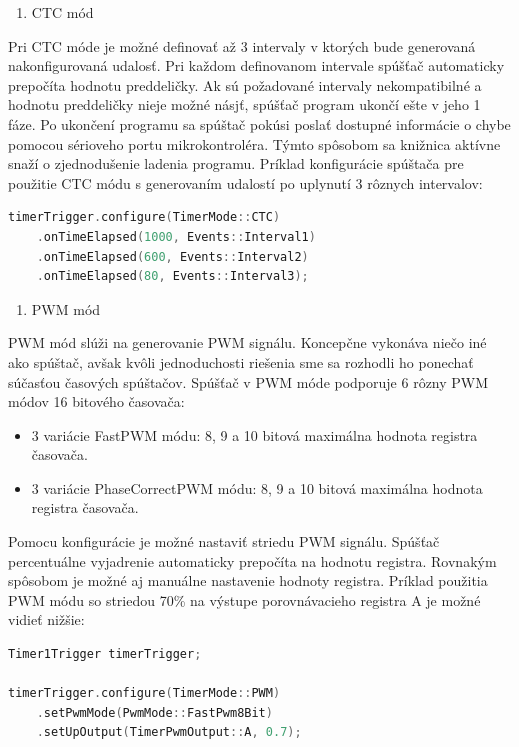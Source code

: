 \begin{enumerate}[resume]
    \item CTC mód
\end{enumerate}

Pri CTC móde je možné definovať až 3 intervaly v ktorých bude generovaná nakonfigurovaná udalosť. Pri každom definovanom intervale spúšťač automaticky prepočíta
hodnotu preddeličky. Ak sú požadované intervaly nekompatibilné a hodnotu preddeličky nieje možné násjť, spúšťač program ukončí ešte v jeho 1 fáze. Po ukončení programu
sa spúštač pokúsi poslať dostupné informácie o chybe pomocou sérioveho portu mikrokontroléra. Týmto spôsobom sa knižnica aktívne snaží o zjednodušenie ladenia programu.
Príklad konfigurácie spúštača pre použitie CTC módu s generovaním udalostí po uplynutí 3 rôznych intervalov:
\begin{lstlisting}[language=c++]      
timerTrigger.configure(TimerMode::CTC)
    .onTimeElapsed(1000, Events::Interval1)
    .onTimeElapsed(600, Events::Interval2)
    .onTimeElapsed(80, Events::Interval3);
\end{lstlisting}

\begin{enumerate}[resume]
    \item PWM mód
\end{enumerate}

PWM mód slúži na generovanie PWM signálu. Koncepčne vykonáva niečo iné ako spúštač, avšak kvôli jednoduchosti riešenia sme sa rozhodli ho ponechať súčasťou časových
spúštačov. Spúšťač v PWM móde podporuje 6 rôzny PWM módov 16 bitového časovača:
\begin{itemize}
    \item 3 variácie FastPWM módu: 8, 9 a 10 bitová maximálna hodnota registra časovača.
    \item 3 variácie PhaseCorrectPWM módu: 8, 9 a 10 bitová maximálna hodnota registra časovača.
\end{itemize}

Pomocu konfigurácie je možné nastaviť striedu PWM signálu. Spúšťač percentuálne vyjadrenie automaticky prepočíta na hodnotu registra. Rovnakým spôsobom je možné
aj manuálne nastavenie hodnoty registra. Príklad použitia PWM módu so striedou 70\% na  výstupe porovnávacieho registra A je možné vidieť nižšie:

\begin{lstlisting}[language=c++]      
Timer1Trigger timerTrigger;

timerTrigger.configure(TimerMode::PWM)
    .setPwmMode(PwmMode::FastPwm8Bit)
    .setUpOutput(TimerPwmOutput::A, 0.7);
\end{lstlisting}


